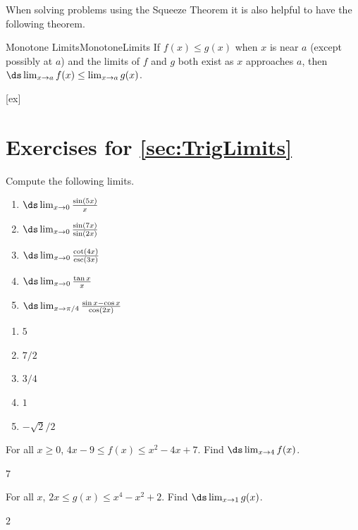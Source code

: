 When solving problems using the Squeeze Theorem it is also helpful to have the following theorem.

\begin{theorem}{Monotone Limits}{MonotoneLimits}\label{MonotoneLimits} 
If $f(x)\leq g(x)$ when $x$ is near $a$ (except possibly at $a$) and the limits of $f$ and $g$ both exist as $x$ approaches $a$, then $\ds\lim_{x\to a}f(x)\leq\lim_{x\to a}g(x)$.
\end{theorem}


[ex]
\section*{Exercises for \ref{sec:TrigLimits}}

\begin{enumialphparenastyle}

\begin{ex}
Compute the following limits.
\begin{enumerate}
	\item	$\ds\lim_{x\to 0} {\sin (5x)\over x}$
	\item	$\ds\lim_{x\to 0 } {\sin(7x)\over\sin (2x)}$
	\item	$\ds\lim_{x\to 0 } {\cot (4x) \over\csc (3x)}$
	\item	$\ds\lim_{x\to 0 } {\tan x\over x}$
	\item	$\ds\lim_{x\to \pi/4} {\sin x-\cos x \over\cos (2x)}$
\end{enumerate}
\begin{sol}
\begin{enumerate}
	\item	$5$
	\item	$7/2$
	\item	$3/4$
	\item	$1$
	\item	$-\sqrt2/2$
\end{enumerate}
\end{sol}
\end{ex}

\begin{ex} 
For all $x\geq 0$, $4x-9 \leq f(x) \leq x^2 - 4x +7$. Find $\ds\lim_{x\to4}f(x)$.
\begin{sol}
 $7$
\end{sol}
\end{ex}

\begin{ex} 
For all $x$, $2x \leq g(x) \leq x^4 - x^2 +2$. Find $\ds\lim_{x\to1}g(x)$.
\begin{sol}
 $2$
\end{sol}
\end{ex}


\end{enumialphparenastyle}
